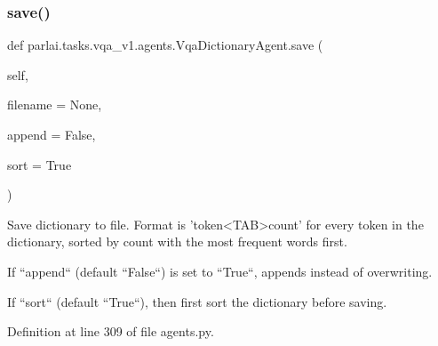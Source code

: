 \mbox{\label{classparlai_1_1tasks_1_1vqa__v1_1_1agents_1_1VqaDictionaryAgent_ac547c4960c1f49242d42c07264d6e047}} 
\subsubsection{\texorpdfstring{save()}{save()}}
{\footnotesize\ttfamily def parlai.\+tasks.\+vqa\+\_\+v1.\+agents.\+Vqa\+Dictionary\+Agent.\+save (\begin{DoxyParamCaption}\item[{}]{self,  }\item[{}]{filename = {\ttfamily None},  }\item[{}]{append = {\ttfamily False},  }\item[{}]{sort = {\ttfamily True} }\end{DoxyParamCaption})}

\begin{DoxyVerb}Save dictionary to file. Format is 'token<TAB>count' for every token in the
dictionary, sorted by count with the most frequent words first.

If ``append`` (default ``False``) is set to ``True``, appends instead
of overwriting.

If ``sort`` (default ``True``), then first sort the dictionary before
saving.
\end{DoxyVerb}
 

Definition at line 309 of file agents.\+py.


